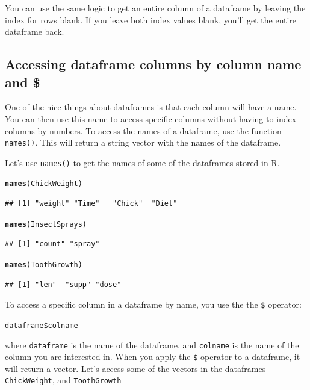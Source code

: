\documentclass{tufte-book}\usepackage[]{graphicx}\usepackage[]{color}
\makeatletter
\newcommand{\hlstd}[1]{\textcolor[rgb]{0.345,0.345,0.345}{#1}}%
\newcommand{\hlkwd}[1]{\textcolor[rgb]{0.737,0.353,0.396}{\textbf{#1}}}%
\newenvironment{kframe}{%
 \def\at@end@of@kframe{}%
 \ifinner\ifhmode%
  \def\at@end@of@kframe{\end{minipage}}%
  \begin{minipage}{\columnwidth}%
 \fi\fi%
 \def\FrameCommand##1{\hskip\@totalleftmargin \hskip-\fboxsep
 \colorbox{shadecolor}{##1}\hskip-\fboxsep
     \hskip-\linewidth \hskip-\@totalleftmargin \hskip\columnwidth}%
 \MakeFramed {\advance\hsize-\width
   \@totalleftmargin\z@ \linewidth\hsize
   \@setminipage}}%
 {\par\unskip\endMakeFramed%
 \at@end@of@kframe}
\newenvironment{knitrout}{}{} %
\newcommand{\newfun}[1]{\begin{LARGE} \begin{center} \texttt{#1} \end{center} \end{LARGE}}
\makeatother
\begin{document}
\begin{footnotesize}
You can use the same logic to get an entire column of a dataframe by leaving the index for rows blank. If you leave both index values blank, you'll get the entire dataframe back.

\subsection{Accessing dataframe columns by column name and \$}

One of the nice things about dataframes is that each column will have a name. You can then use this name to access specific columns without having to index columns by numbers. To access the names of a dataframe, use the function \texttt{names()}. This will return a string vector with the names of the dataframe.

Let's use \texttt{names()} to get the names of some of the dataframes stored in R.

\begin{footnotesize}
\begin{knitrout}
\color{fgcolor}\begin{kframe}
\begin{alltt}
\hlkwd{names}\hlstd{(ChickWeight)}
\end{alltt}
\begin{verbatim}
## [1] "weight" "Time"   "Chick"  "Diet"
\end{verbatim}
\begin{alltt}
\hlkwd{names}\hlstd{(InsectSprays)}
\end{alltt}
\begin{verbatim}
## [1] "count" "spray"
\end{verbatim}
\begin{alltt}
\hlkwd{names}\hlstd{(ToothGrowth)}
\end{alltt}
\begin{verbatim}
## [1] "len"  "supp" "dose"
\end{verbatim}
\end{kframe}
\end{knitrout}
\end{footnotesize}

To access a specific column in a dataframe by name, you use the the \texttt{\$} operator:

\newfun{dataframe\$colname}

where \texttt{dataframe} is the name of the dataframe, and \texttt{colname} is the name of the column you are interested in. When you apply the \texttt{\$} operator to a dataframe, it will return a vector. Let's access some of the vectors in the dataframes \texttt{ChickWeight}, and \texttt{ToothGrowth}


\end{footnotesize}
\end{document}
